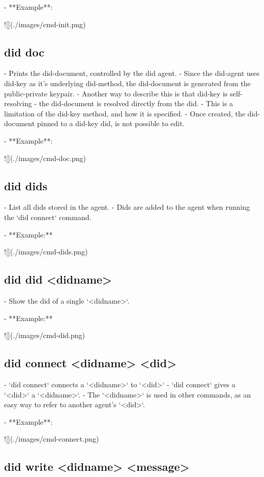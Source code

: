 - **Example**:

    ![](./images/cmd-init.png)


\subsection{did doc}

- Prints the did-document, controlled by the did agent.
- Since the did-agent uses did-key as it's underlying did-method, the did-document is generated from the public-private keypair.
- Another way to describe this is that did-key is self-resolving - the did-document is resolved directly from the did.
- This is a limitation of the did-key method, and how it is specified.
- Once created, the did-document pinned to a did-key did, is not possible to edit.

- **Example**:

    ![](./images/cmd-doc.png)


\subsection{did dids}

- List all dids stored in the agent.
- Dids are added to the agent when running the `did connect` command.

- **Example:**

    ![](./images/cmd-dids.png)

\subsection{did did <didname>}

- Show the did of a single `<didname>`.

- **Example:**

    ![](./images/cmd-did.png)


\subsection{did connect <didname> <did>}

- `did connect` connects a `<didname>` to `<did>`
- `did connect` gives a `<did>` a `<didname>`.
- The `<didname>` is used in other commands, as an easy way to refer to another agent's `<did>`.

- **Example**:

    ![](./images/cmd-connect.png)

\subsection{did write <didname> <message>}

